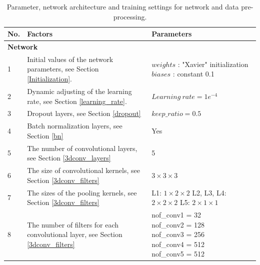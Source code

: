   \renewcommand\arraystretch{1.2}  
\begin{table}
	\caption{Parameter, network architecture and training settings for network and data pre-processing.}
	\begin{center}
		\begin{tabular}{| m{0.6cm} | m{7cm} | m{6cm} |}
			\hline
			\textbf{No.} & \textbf{Factors} & \textbf{Parameters}  \\ \hline \hline
			\multicolumn{3}{|l|}{\textbf{Network}}  \\ \hline
			
			1 & Initial values of the network parameters, see Section \ref{Initialization}. & \tabincell{l} 
			{ \(weights\) : "Xavier" initialization \\ 
				\(biases\) : constant 0.1} \\ \hline
			
			2 & Dynamic adjusting of the learning rate, see Section \ref{learning_rate}. & \(Learning\ rate = 1e^{-4} \)	\\ \hline
			
			3 & Dropout layers, see Section \ref{dropout} & \(keep\_ratio = 0.5\)	\\ \hline
			
			4 & Batch normalization layers, see Section \ref{bn} &  Yes  \\ \hline
			
			5 & The number of convolutional layers, see Section \ref{3dconv_layers} & 5\\ \hline
			
			6 & The size of convolutional kernels, see Section \ref{3dconv_filters} & \(3 \times 3 \times 3\) \\ \hline
			
			7 & The sizes of the pooling kernels, see Section \ref{3dconv_filters} & \tabincell{l}
			{L1: \(1 \times 2 \times 2 \) \\ 
				L2, L3, L4: \(2 \times 2 \times 2 \) \\
				L5: \(2 \times 1 \times 1 \)}   \\ \hline
			
			8 &  The number of filters for each convolutional layer, see Section \ref{3dconv_filters} &  \tabincell{l}
			{nof\_conv1 = 32 \\ 
			nof\_conv2 = 128  \\
			nof\_conv3 = 256  \\
			nof\_conv4 = 512 \\
			nof\_conv5 = 512}  \\ \hline
			

\end{tabular}
\end{center}
\end{table}
